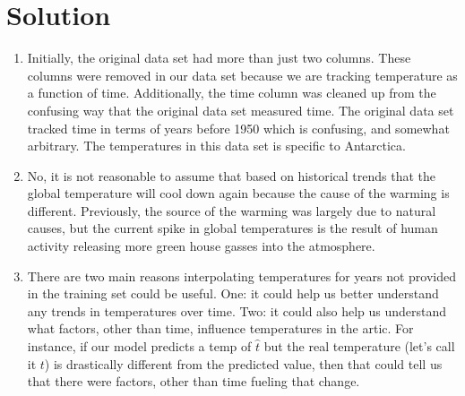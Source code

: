 \documentclass[submit]{harvardml}
\newenvironment{solution}
  {\color{blue}\section*{Solution}}
{}
\begin{document}
\begin{solution}
	\begin{enumerate}
	    \item Initially, the original data set had more than just two columns. These columns were removed in our data set because we are tracking temperature as a function of time. Additionally, the time column was cleaned up from the confusing way that the original data set measured time. The original data set tracked time in terms of years before 1950 which is confusing, and somewhat arbitrary. The temperatures in this data set is specific to Antarctica.

        \item No, it is not reasonable to assume that based on historical trends that the global temperature will cool down again because the cause of the warming is different. Previously, the source of the warming was largely due to natural causes, but the current spike in global temperatures is the result of human activity releasing more green house gasses into the atmosphere.  
        \item There are two main reasons interpolating temperatures for years not provided in the training set could be useful. One: it could help us better understand any trends in temperatures over time. Two: it could also help us understand what factors, other than time, influence temperatures in the artic. For instance, if our model predicts a temp of $\hat{t}$ but the real temperature (let's call it $t$) is drastically different from the predicted value, then that could tell us that there were factors, other than time fueling that change.
	\end{enumerate}
\end{solution}

\pagebreak
\end{document}
